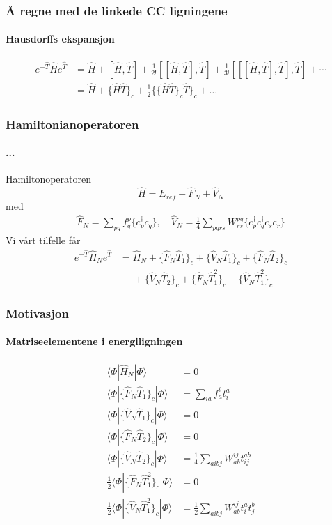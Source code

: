 \documentclass[norsk,a4paper,12pt]{beamer}
\begin{document}
  \begin{frame}
    \frametitle{Å regne med de linkede CC ligningene}
    \framesubtitle{Hausdorffs ekspansjon}
    \begin{align*}
    e^{-\hat{T}}\hat{H}e^{\hat{T}}&=\hat{H}+[\hat{H},\hat{T}]+\frac{1}{2!}[[\hat{H},\hat{T}],\hat{T}]+\frac{1}{3!}[[[\hat{H},\hat{T}],\hat{T}],\hat{T}]+\cdots\\
    &=\hat{H}+\{\hat{H}\hat{T}\}_c+\frac{1}{2}\{\{\hat{H}\hat{T}\}_c\hat{T}\}_c+\hdots
    \end{align*}
  \end{frame}
  \begin{frame}
    \frametitle{Hamiltonianoperatoren}
    \framesubtitle{...}
    Hamiltonoperatoren
    \begin{equation*}
    \hat{H}=E_{ref}+\hat{F}_N+\hat{V}_N
    \end{equation*}
    med
    \begin{align*}
    \hat{F}_N=\sum_{pq}f_q^p\{c_p^{\dagger}c_q\},\quad \hat{V}_N=\frac{1}{4}\sum_{pqrs}W_{rs}^{pq}\{c_p^{\dagger}c_q^{\dagger}c_sc_r\}
    \end{align*}
    Vi vårt tilfelle får
    \begin{align*}
    e^{-\hat{T}}\hat{H}_Ne^{\hat{T}}&=\hat{H}_N+\{\hat{F}_N\hat{T}_1\}_c+\{\hat{V}_N\hat{T}_1\}_c+\{\hat{F}_N\hat{T}_2\}_c\\
    &\mathrel{\phantom{=}}+\{\hat{V}_N\hat{T}_2\}_c+\{\hat{F}_N\hat{T}_1^2\}_c+\{\hat{V}_N\hat{T}_1^2\}_c
    \end{align*}
  \end{frame}
  \begin{frame}
    \frametitle{Motivasjon}
    \framesubtitle{Matriseelementene i energiligningen}
    \begin{align*}
    \langle\Phi|\hat{H}_N|\Phi\rangle&=0\\
    \langle\Phi|\{\hat{F}_N\hat{T}_1\}_c|\Phi\rangle&=\sum_{ia}f_a^it_i^a\\
    \langle\Phi|\{\hat{V}_N\hat{T}_1\}_c|\Phi\rangle&=0\\
    \langle\Phi|\{\hat{F}_N\hat{T}_2\}_c|\Phi\rangle&=0\\
    \langle\Phi|\{\hat{V}_N\hat{T}_2\}_c|\Phi\rangle&=\frac{1}{4}\sum_{aibj}W_{ab}^{ij}t_{ij}^{ab}\\
    \frac{1}{2}\langle\Phi|\{\hat{F}_N\hat{T}_1^2\}_c|\Phi\rangle&=0\\
    \frac{1}{2}\langle\Phi|\{\hat{V}_N\hat{T}_1^2\}_c|\Phi\rangle&=\frac{1}{2}\sum_{aibj}W_{ab}^{ij}t_i^at_j^b
    \end{align*}
    
  \end{frame}
\end{document}
